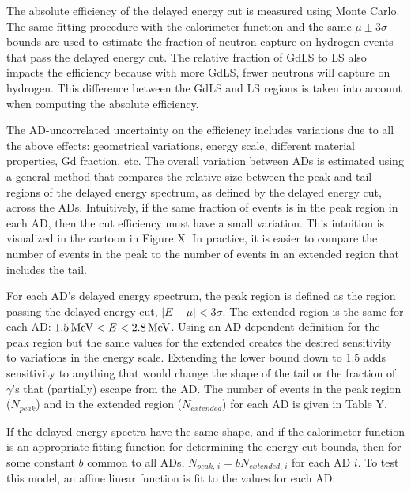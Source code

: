 The absolute efficiency of the delayed energy cut
is measured using Monte Carlo.
The same fitting procedure with the calorimeter function
and the same $\mu \pm 3\sigma$ bounds are used to
estimate the fraction of neutron capture on hydrogen events
that pass the delayed energy cut.
The relative fraction of GdLS to LS also impacts the efficiency
because with more GdLS, fewer neutrons will capture on hydrogen.
This difference between the GdLS and LS regions is taken into account
when computing the absolute efficiency.

The AD-uncorrelated uncertainty on the efficiency
includes variations due to all the above effects:
geometrical variations, energy scale, different material properties,
Gd fraction, etc.
The overall variation between ADs is estimated using a general method
that compares the relative size between the peak and tail regions
of the delayed energy spectrum, as defined by the delayed energy cut,
across the ADs.
Intuitively, if the same fraction of events is in the peak region in each AD,
then the cut efficiency must have a small variation.
This intuition is visualized in the cartoon in Figure X. %
In practice, it is easier to compare the number of events in the peak
to the number of events in an extended region that includes the tail.

For each AD's delayed energy spectrum, the peak region is defined as
the region passing the delayed energy cut, $\vert E-\mu \vert < 3\sigma$.
The extended region is the same for each AD:
$\SI{1.5}{\mega\electronvolt} < E < \SI{2.8}{\mega\electronvolt}$.
Using an AD-dependent definition for the peak region but
the same values for the extended creates
the desired sensitivity to variations in the energy scale.
Extending the lower bound down to \SI{1.5}{\mev} adds sensitivity to
anything that would change the shape of the tail
or the fraction of $\gamma$'s that (partially) escape from the AD.
The number of events in the peak region ($N_{peak}$)
and in the extended region ($N_{extended}$) for each AD
is given in Table Y. %

If the delayed energy spectra have the same shape,
and if the calorimeter function is an appropriate fitting function
for determining the energy cut bounds,
then for some constant $b$ common to all ADs,
$N_{peak,\,i} = b N_{extended,\,i}$ for each AD $i$.
To test this model, an affine linear function is fit
to the values for each AD:

